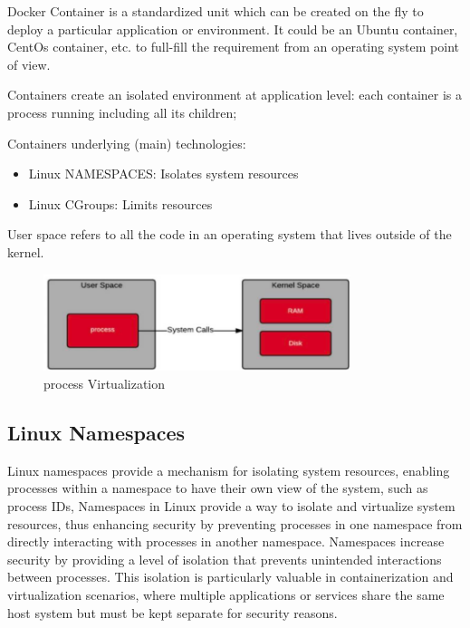 Docker Container is a standardized unit which can be created on the fly to
deploy a particular application or environment. It could be an Ubuntu container,
CentOs container, etc. to full-fill the requirement from an operating system point of
view.

Containers create an isolated environment at application level: each container is a process running including all its children;

Containers underlying (main) technologies:
\begin{itemize}
    \item Linux NAMESPACES: Isolates system resources
    \item Linux CGroups: Limits resources
\end{itemize}

User space refers to all the code in an operating system that lives outside of the kernel.

\begin{figure}[H]
    \centering
    \includegraphics[width=0.8\textwidth]{assets/fig35.png}
    \caption{process Virtualization}
\end{figure}

\subsection{Linux Namespaces}

Linux namespaces provide a mechanism for isolating system resources, enabling
processes within a namespace to have their own view of the system, such as
process IDs,
Namespaces in Linux provide a way to isolate and virtualize system resources, thus
enhancing security by preventing processes in one namespace from directly
interacting with processes in another namespace.
Namespaces increase security by providing a level of isolation that prevents
unintended interactions between processes. This isolation is particularly valuable in
containerization and virtualization scenarios, where multiple applications or
services share the same host system but must be kept separate for security
reasons.

